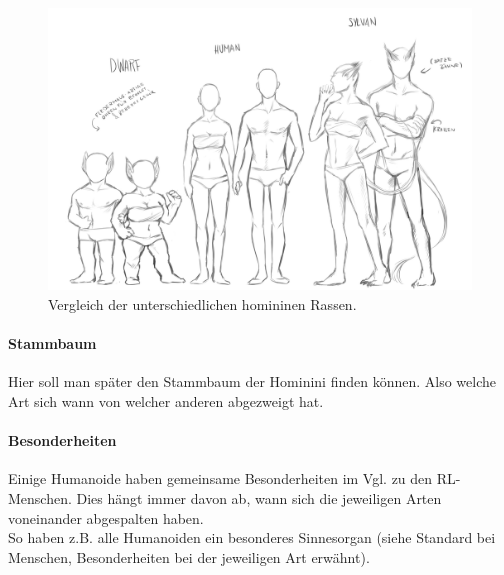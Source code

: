 \begin{figure}
	\centering
	\includegraphics[width=1.0\linewidth]{Abbildungen/Weltenbau/Lebensformen/allerassen}
	\caption{Vergleich der unterschiedlichen homininen Rassen.}
	\label{fig:allerassen}
\end{figure}


\paragraph{Stammbaum} Hier soll man später den Stammbaum der Hominini finden können. Also welche Art sich wann von welcher anderen abgezweigt hat.

\paragraph{Besonderheiten}
Einige Humanoide haben gemeinsame Besonderheiten im Vgl. zu den RL-Menschen. Dies hängt immer davon ab, wann sich die jeweiligen Arten voneinander abgespalten haben. \\
So haben z.B. alle Humanoiden ein besonderes Sinnesorgan (siehe Standard bei Menschen, Besonderheiten bei der jeweiligen Art erwähnt).


